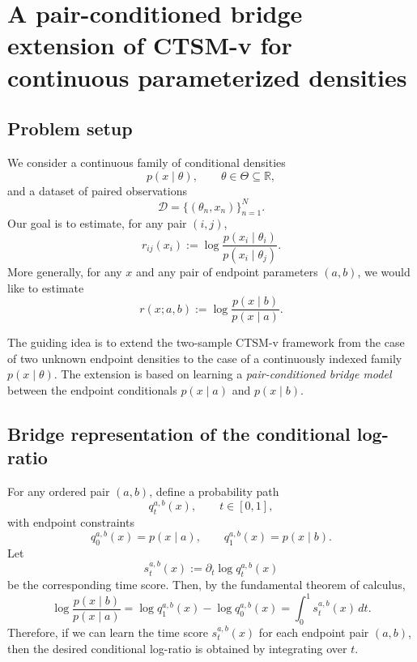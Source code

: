 \section{A pair-conditioned bridge extension of CTSM-v for continuous parameterized densities}

\subsection{Problem setup}

We consider a continuous family of conditional densities
\begin{equation}
    p(x\mid \theta), \qquad \theta \in \Theta \subseteq \mathbb{R},
\end{equation}
and a dataset of paired observations
\begin{equation}
    \mathcal{D} = \{(\theta_n, x_n)\}_{n=1}^N.
\end{equation}
Our goal is to estimate, for any pair $(i,j)$,
\begin{equation}
    r_{ij}(x_i)
    :=
    \log \frac{p(x_i\mid \theta_i)}{p(x_i\mid \theta_j)}.
\end{equation}
More generally, for any $x$ and any pair of endpoint parameters $(a,b)$, we would like to estimate
\begin{equation}
    r(x; a,b)
    :=
    \log \frac{p(x\mid b)}{p(x\mid a)}.
\end{equation}

The guiding idea is to extend the two-sample CTSM-v framework from the case of two unknown endpoint densities to the case of a continuously indexed family $p(x\mid \theta)$. The extension is based on learning a \emph{pair-conditioned bridge model} between the endpoint conditionals $p(x\mid a)$ and $p(x\mid b)$.

\subsection{Bridge representation of the conditional log-ratio}

For any ordered pair $(a,b)$, define a probability path
\begin{equation}
    q_t^{a,b}(x), \qquad t \in [0,1],
\end{equation}
with endpoint constraints
\begin{equation}
    q_0^{a,b}(x) = p(x\mid a),
    \qquad
    q_1^{a,b}(x) = p(x\mid b).
\end{equation}
Let
\begin{equation}
    s_t^{a,b}(x)
    :=
    \partial_t \log q_t^{a,b}(x)
\end{equation}
be the corresponding time score. Then, by the fundamental theorem of calculus,
\begin{equation}
    \log \frac{p(x\mid b)}{p(x\mid a)}
    =
    \log q_1^{a,b}(x) - \log q_0^{a,b}(x)
    =
    \int_0^1 s_t^{a,b}(x) \, dt.
    \label{eq:ratio_from_time_score}
\end{equation}
Therefore, if we can learn the time score $s_t^{a,b}(x)$ for each endpoint pair $(a,b)$, then the desired conditional log-ratio is obtained by integrating over $t$.

